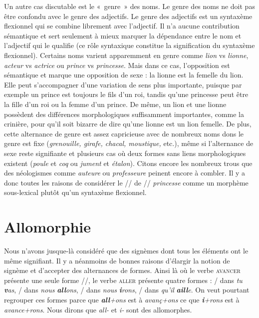 {    Un autre cas discutable est le «~genre~» des noms. Le genre des noms ne doit pas être confondu avec le genre des adjectifs. Le genre des adjectifs est un syntaxème flexionnel qui se combine librement avec l’adjectif. Il n’a aucune contribution sémantique et sert seulement à mieux marquer la dépendance entre le nom et l’adjectif qui le qualifie (ce rôle syntaxique constitue la signification du syntaxème flexionnel). Certains noms varient apparemment en genre comme \textit{lion} vs \textit{lionne}, \textit{acteur} vs \textit{actrice} ou \textit{prince} vs \textit{princesse}. Mais dans ce cas, l’opposition est sémantique et marque une opposition de sexe : la lionne est la femelle du lion. Elle peut s’accompagner d’une variation de sens plus importante, puisque par exemple un prince est toujours le fils d’un roi, tandis qu’une princesse peut être la fille d’un roi ou la femme d’un prince. De même, un lion et une lionne possèdent des différences morphologiques suffisamment importantes, comme la crinière, pour qu’il soit bizarre de dire qu’une lionne est un lion femelle. De plus, cette alternance de genre est assez capricieuse avec de nombreux noms dons le genre est fixe (\textit{grenouille, girafe, chacal, moustique,} etc.), même si l’alternance de sexe reste signifiante et plusieurs cas où deux formes sans liens morphologiques existent (\textit{poule} et \textit{coq} ou \textit{jument} et \textit{étalon}). Citons encore les nombreux trous que des néologismes comme \textit{auteure} ou \textit{professeure} peinent encore à combler. Il y a donc toutes les raisons de considérer le // de // \textit{princesse} comme un morphème sous-lexical plutôt qu’un syntaxème flexionnel.
}
\section{Allomorphie}\label{sec:2.2.20}

Nous n’avons jusque-là considéré que des signèmes dont tous les éléments ont le même signifiant. Il y a néanmoins de bonnes raisons d’élargir la notion de signème et d’accepter des alternances de formes. Ainsi là où le verbe \textsc{avancer} présente une seule forme //, le verbe \textsc{aller} présente quatre formes : / dans \textit{tu} \textbf{\textit{v}}\textit{as}, / dans \textit{nous} \textbf{\textit{all}}\textit{ons}, / dans \textit{nous} \textbf{\textit{i}}\textit{rons}, / dans \textit{qu’il} \textbf{\textit{aill}}\textit{e}. On veut pourtant regrouper ces formes parce que \textbf{\textit{all}}\textit{+ons} est à \textit{avanç+ons} ce que \textbf{\textit{i}}\textit{+rons} est à \textit{avance+rons}. Nous dirons que \textit{all-} et \textit{i-} sont des allomorphes.

